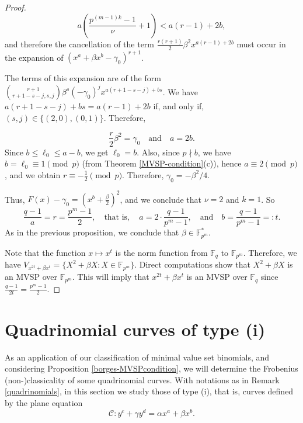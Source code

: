 \documentclass[preprint,12pt]{elsarticle}
\begin{document}
\begin{proof}
    $$
    a\left( \frac{p^{(m - 1)k} - 1}{\nu} + 1 \right) < a(r - 1) + 2b,
    $$
    and therefore the cancellation of the term $\frac{r(r + 1)}{2} \beta^2 x^{a(r - 1) + 2b}$ must occur in the expansion of $(x^a + \beta x^b - \gamma_0)^{r + 1}$. 
    
    The terms of this expansion are of the form $\binom{r + 1}{r + 1 - s - j, s, j}\beta^s(-\gamma_0)^j x^{a(r + 1 - s - j) + bs}$. We have $a(r + 1 - s - j) + bs = a(r - 1) + 2b$ if, and only if, $(s, j) \in \{(2, 0), (0,1)\}$. Therefore,

    $$
    \frac{r}{2} \beta^2 = \gamma_0 \quad \textrm{and} \quad a = 2b.
    $$
    Since $b \leq \ell_0 \leq a - b$, we get $\ell_0 = b$. Also, since $p \nmid b$, we have $b = \ell_0 \equiv 1 \pmod{p}$ (from Theorem \ref{MVSP-condition}(c)), hence $a \equiv 2 \pmod{p}$, and we obtain $r \equiv -\frac{1}{2} \pmod{p}$. Therefore, $\gamma_0 = -\beta^2 / 4$.

    Thus, $F(x) - \gamma_0 = \left(x^b + \frac{\beta}{2}\right)^2$, and we conclude that $\nu = 2$ and $k = 1$. So
    $$
    \frac{q - 1}{a} = r = \frac{p^m - 1}{2}, \quad \text{that is}, \quad 
    a = 2 \cdot \frac{q - 1}{p^m - 1}, \quad \text{and} \quad b = \frac{q - 1}{p^m - 1} =: t.
    $$
    As in the previous proposition, we conclude that $\beta \in \mathbb{F}_{p^m}^*$.

    Note that the function $x \mapsto x^t$ is the norm function from $\mathbb{F}_q$ to $\mathbb{F}_{p^m}$. Therefore, we have $V_{x^{2t} + \beta x^t} = \{X^2 + \beta X : X \in \mathbb{F}_{p^m}\}$. Direct computations show that $X^2 + \beta X$ is an MVSP over $\mathbb{F}_{p^m}$. This will imply that $x^{2t} + \beta x^t$ is an MVSP over $\mathbb{F}_q$ since $\frac{q - 1}{2t} = \frac{p^m - 1}{2}$.
\end{proof}

\section{Quadrinomial curves of type (i)}\label{section:quadrinomial1}

 As an application of our classification of minimal value set binomials, and considering Proposition \ref{borges-MVSPcondition}, we will determine the Frobenius (non-)classicality of some quadrinomial curves. With notations as in Remark \ref{quadrinomials}, in this section we study those of type (i), that is, curves defined by the plane equation
$$
\mathcal{C}: y^c + \gamma y^d = \alpha x^a + \beta x^b.
$$
\end{document}
